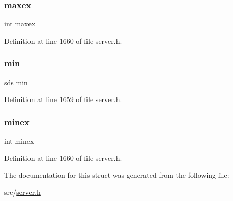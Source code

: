 \mbox{\label{structzlexrangespec_a3d965e52da103eda2e33d871b0658cf3}} 
\subsubsection{\texorpdfstring{maxex}{maxex}}
{\footnotesize\ttfamily int maxex}



Definition at line 1660 of file server.\+h.

\mbox{\label{structzlexrangespec_aad18fc6b5dc17b81b9d0a7048634886f}} 
\subsubsection{\texorpdfstring{min}{min}}
{\footnotesize\ttfamily \hyperlink{sds_8h_ad69abac3df4532879db9642c95f5ef6f}{sds} min}



Definition at line 1659 of file server.\+h.

\mbox{\label{structzlexrangespec_a8e30ae1b8a7b7c514cb8bf62df65f4eb}} 
\subsubsection{\texorpdfstring{minex}{minex}}
{\footnotesize\ttfamily int minex}



Definition at line 1660 of file server.\+h.



The documentation for this struct was generated from the following file\+:\begin{DoxyCompactItemize}
\item 
src/\hyperlink{server_8h}{server.\+h}\end{DoxyCompactItemize}
